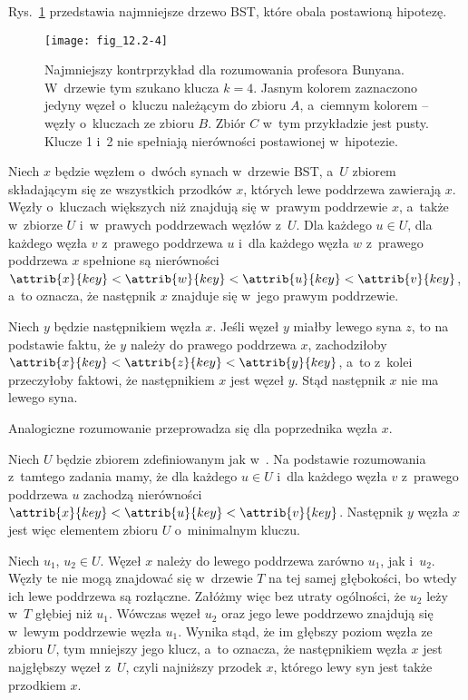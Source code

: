 \exercise %
Rys.\ \ref{fig:12.2-4} przedstawia najmniejsze drzewo BST, które obala postawioną hipotezę.
\begin{figure}[ht]
	\begin{center}
		\texttt{[image: fig\_12.2-4]}
	\end{center}
	\caption{Najmniejszy kontrprzykład dla rozumowania profesora Bunyana.
W~drzewie tym szukano klucza $k=4$.
Jasnym kolorem zaznaczono jedyny węzeł o~kluczu należącym do zbioru $A$, a~ciemnym kolorem -- węzły o~kluczach ze zbioru $B$.
Zbiór $C$ w~tym przykładzie jest pusty.
Klucze 1 i~2 nie spełniają nierówności postawionej w~hipotezie.} \label{fig:12.2-4}
\end{figure}

\exercise %
Niech $x$ będzie węzłem o~dwóch synach w~drzewie BST, a~$U$ zbiorem składającym się ze wszystkich przodków $x$, których lewe poddrzewa zawierają $x$.
Węzły o~kluczach większych niż  znajdują się w~prawym poddrzewie $x$, a~także w~zbiorze $U$ i~w~prawych poddrzewach węzłów z~$U$.
Dla każdego $u\in U$, dla każdego węzła $v$ z~prawego poddrzewa $u$ i~dla każdego węzła $w$ z~prawego poddrzewa $x$ spełnione są nierówności $\attrib{x}{key}<\attrib{w}{key}<\attrib{u}{key}<\attrib{v}{key}$, a~to oznacza, że następnik $x$ znajduje się w~jego prawym poddrzewie.

Niech $y$ będzie następnikiem węzła $x$.
Jeśli węzeł $y$ miałby lewego syna $z$, to na podstawie faktu, że $y$ należy do prawego poddrzewa $x$, zachodziłoby $\attrib{x}{key}<\attrib{z}{key}<\attrib{y}{key}$, a~to z~kolei przeczyłoby faktowi, że następnikiem $x$ jest węzeł $y$.
Stąd następnik $x$ nie ma lewego syna.

Analogiczne rozumowanie przeprowadza się dla poprzednika węzła $x$.

\exercise %
Niech $U$ będzie zbiorem zdefiniowanym jak w~.
Na podstawie rozumowania z~tamtego zadania mamy, że dla każdego $u\in U$ i~dla każdego węzła $v$ z~prawego poddrzewa $u$ zachodzą nierówności $\attrib{x}{key}<\attrib{u}{key}<\attrib{v}{key}$.
Następnik $y$ węzła $x$ jest więc elementem zbioru $U$ o~minimalnym kluczu.

Niech $u_1$, $u_2\in U$.
Węzeł $x$ należy do lewego poddrzewa zarówno $u_1$, jak i~$u_2$.
Węzły te nie mogą znajdować się w~drzewie $T$ na tej samej głębokości, bo wtedy ich lewe poddrzewa są rozłączne.
Załóżmy więc bez utraty ogólności, że $u_2$ leży w~$T$ głębiej niż $u_1$.
Wówczas węzeł $u_2$ oraz jego lewe poddrzewo znajdują się w~lewym poddrzewie węzła $u_1$.
Wynika stąd, że im głębszy poziom węzła ze zbioru $U$, tym mniejszy jego klucz, a~to oznacza, że następnikiem węzła $x$ jest najgłębszy węzeł z~$U$, czyli najniższy przodek $x$, którego lewy syn jest także przodkiem $x$.

